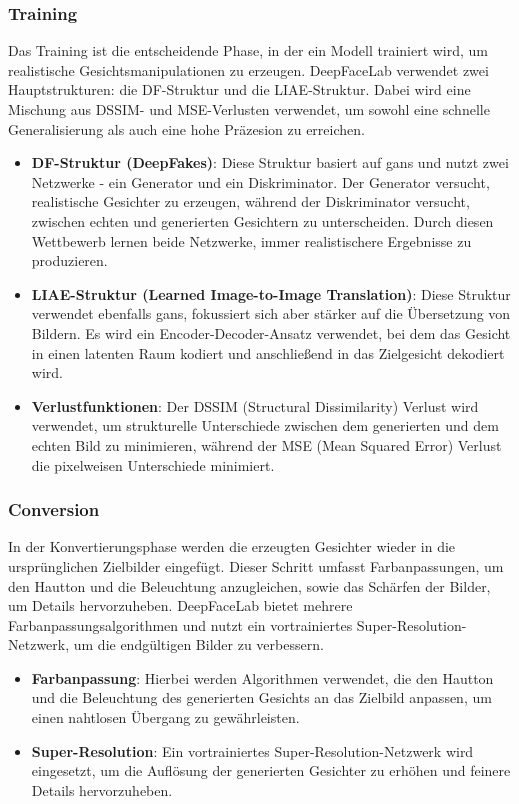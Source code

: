 \subsubsection{Training}
Das Training ist die entscheidende Phase, in der ein Modell trainiert wird, um realistische Gesichtsmanipulationen zu erzeugen.
DeepFaceLab verwendet zwei Hauptstrukturen: die DF-Struktur und die LIAE-Struktur.
Dabei wird eine Mischung aus DSSIM- und MSE-Verlusten verwendet, um sowohl eine schnelle Generalisierung als auch eine hohe Präzesion zu erreichen\cite{deepfacelabintegratedflexibleextensible, deepfacelab}.

\begin{itemize}
    \item \textbf{DF-Struktur (DeepFakes)}: Diese Struktur basiert auf \glspl{gan} und nutzt zwei Netzwerke - ein Generator und ein Diskriminator. 
    Der Generator versucht, realistische Gesichter zu erzeugen, während der Diskriminator versucht, zwischen echten und generierten Gesichtern zu unterscheiden.
    Durch diesen Wettbewerb lernen beide Netzwerke, immer realistischere Ergebnisse zu produzieren.
    \item \textbf{LIAE-Struktur (Learned Image-to-Image Translation)}: Diese Struktur verwendet ebenfalls \glspl{gan}, fokussiert sich aber stärker auf die Übersetzung von Bildern. 
     Es wird ein Encoder-Decoder-Ansatz verwendet, bei dem das Gesicht in einen latenten Raum kodiert und anschließend in das Zielgesicht dekodiert wird.
    \item \textbf{Verlustfunktionen}: Der DSSIM (Structural Dissimilarity) Verlust wird verwendet, um strukturelle Unterschiede zwischen dem generierten und dem echten Bild zu minimieren, während der MSE (Mean Squared Error) Verlust die pixelweisen Unterschiede minimiert.
\end{itemize}

\subsubsection{Conversion}
In der Konvertierungsphase werden die erzeugten Gesichter wieder in die ursprünglichen Zielbilder eingefügt.
Dieser Schritt umfasst Farbanpassungen, um den Hautton und die Beleuchtung anzugleichen, sowie das Schärfen der Bilder, um Details hervorzuheben.
DeepFaceLab bietet mehrere Farbanpassungsalgorithmen und nutzt ein vortrainiertes Super-Resolution-Netzwerk, um die endgültigen Bilder zu verbessern\cite{deepfacelabintegratedflexibleextensible, deepfacelab}.

\begin{itemize}
    \item \textbf{Farbanpassung}: Hierbei werden Algorithmen verwendet, die den Hautton und die Beleuchtung des generierten Gesichts an das Zielbild anpassen, um einen nahtlosen Übergang zu gewährleisten.
    \item \textbf{Super-Resolution}: Ein vortrainiertes Super-Resolution-Netzwerk wird eingesetzt, um die Auflösung der generierten Gesichter zu erhöhen und feinere Details hervorzuheben.
\end{itemize}
